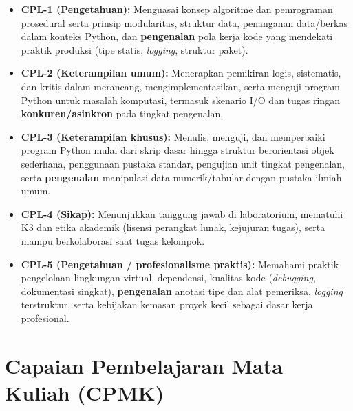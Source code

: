 \documentclass[../main.tex]{subfiles}
\begin{document}
\begin{itemize}[leftmargin=*]
  \item \textbf{CPL-1 (Pengetahuan):} Menguasai konsep algoritme dan pemrograman prosedural serta prinsip modularitas, struktur data, penanganan data/berkas dalam konteks Python, dan \textbf{pengenalan} pola kerja kode yang mendekati praktik produksi (tipe statis, \textit{logging}, struktur paket).
  \item \textbf{CPL-2 (Keterampilan umum):} Menerapkan pemikiran logis, sistematis, dan kritis dalam merancang, mengimplementasikan, serta menguji program Python untuk masalah komputasi, termasuk skenario I/O dan tugas ringan \textbf{konkuren/asinkron} pada tingkat pengenalan.
  \item \textbf{CPL-3 (Keterampilan khusus):} Menulis, menguji, dan memperbaiki program Python mulai dari skrip dasar hingga struktur berorientasi objek sederhana, penggunaan pustaka standar, pengujian unit tingkat pengenalan, serta \textbf{pengenalan} manipulasi data numerik/tabular dengan pustaka ilmiah umum.
  \item \textbf{CPL-4 (Sikap):} Menunjukkan tanggung jawab di laboratorium, mematuhi K3 dan etika akademik (lisensi perangkat lunak, kejujuran tugas), serta mampu berkolaborasi saat tugas kelompok.
  \item \textbf{CPL-5 (Pengetahuan / profesionalisme praktis):} Memahami praktik pengelolaan lingkungan virtual, dependensi, kualitas kode (\textit{debugging}, dokumentasi singkat), \textbf{pengenalan} anotasi tipe dan alat pemeriksa, \textit{logging} terstruktur, serta kebijakan kemasan proyek kecil sebagai dasar kerja profesional.
\end{itemize}

\section{Capaian Pembelajaran Mata Kuliah (CPMK)}
\end{document}
